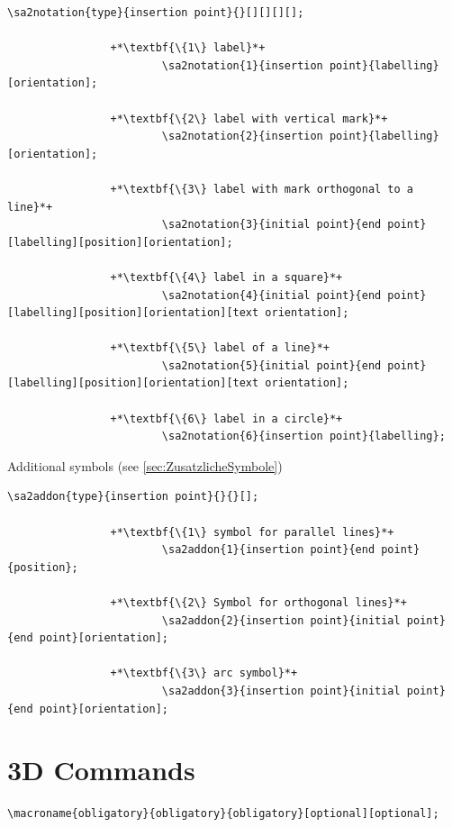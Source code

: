 \documentclass[%
  a4paper,
  BCOR=20mm,
  numbers=noenddot,
  twoside,
  parskip=half,
  openright,
  version=last,
]{scrreprt}
\begin{document}
\begin{lstlisting}[emph={notation},backgroundcolor=\color{white}]
		\sa2notation{type}{insertion point}{}[][][][];
		
				+*\textbf{\{1\} label}*+
						\sa2notation{1}{insertion point}{labelling}[orientation];
						
				+*\textbf{\{2\} label with vertical mark}*+
						\sa2notation{2}{insertion point}{labelling}[orientation];
						
				+*\textbf{\{3\} label with mark orthogonal to a line}*+
						\sa2notation{3}{initial point}{end point}[labelling][position][orientation];
						
				+*\textbf{\{4\} label in a square}*+
						\sa2notation{4}{initial point}{end point}[labelling][position][orientation][text orientation];
						
				+*\textbf{\{5\} label of a line}*+
						\sa2notation{5}{initial point}{end point}[labelling][position][orientation][text orientation];
						
				+*\textbf{\{6\} label in a circle}*+
						\sa2notation{6}{insertion point}{labelling};
\end{lstlisting}\vspace{-10mm}

Additional symbols (see \ref{sec:ZusatzlicheSymbole})

\begin{lstlisting}[emph={addon},backgroundcolor=\color{white}]
		\sa2addon{type}{insertion point}{}{}[];
		
				+*\textbf{\{1\} symbol for parallel lines}*+
						\sa2addon{1}{insertion point}{end point}{position};
						
				+*\textbf{\{2\} Symbol for orthogonal lines}*+
						\sa2addon{2}{insertion point}{initial point}{end point}[orientation];
				
				+*\textbf{\{3\} arc symbol}*+
						\sa2addon{3}{insertion point}{initial point}{end point}[orientation];
\end{lstlisting}\vspace{-10mm}

\newpage
\section{3D Commands}
\label{sec:3dcom}

\begin{lstlisting}[emph={macroname},backgroundcolor=\color{red!10}]
		\macroname{obligatory}{obligatory}{obligatory}[optional][optional];
\end{lstlisting}\vspace{-7mm}
\end{document}
